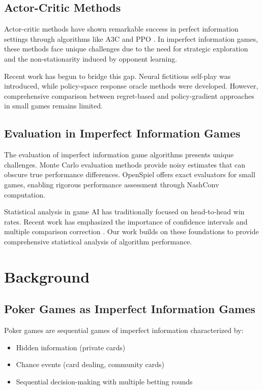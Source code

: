 \documentclass[10pt,twocolumn,conference]{IEEEtran}
\begin{document}
\subsection{Actor-Critic Methods}
Actor-critic methods \cite{konda2000actor} have shown remarkable success in perfect information settings through algorithms like A3C \cite{mnih2016asynchronous} and PPO \cite{schulman2017proximal}. In imperfect information games, these methods face unique challenges due to the need for strategic exploration and the non-stationarity induced by opponent learning.

Recent work has begun to bridge this gap. Neural fictitious self-play \cite{heinrich2015deep} was introduced, while policy-space response oracle methods \cite{waugh2021deep} were developed. However, comprehensive comparison between regret-based and policy-gradient approaches in small games remains limited.

\subsection{Evaluation in Imperfect Information Games}
The evaluation of imperfect information game algorithms presents unique challenges. Monte Carlo evaluation methods provide noisy estimates that can obscure true performance differences. OpenSpiel \cite{lanctot2019openspiel} offers exact evaluators for small games, enabling rigorous performance assessment through NashConv computation.

Statistical analysis in game AI has traditionally focused on head-to-head win rates. Recent work has emphasized the importance of confidence intervals and multiple comparison correction \cite{larus2020statistical}. Our work builds on these foundations to provide comprehensive statistical analysis of algorithm performance.

\section{Background}
\label{sec:background}

\subsection{Poker Games as Imperfect Information Games}
Poker games are sequential games of imperfect information characterized by:
\begin{itemize}
    \item Hidden information (private cards)
    \item Chance events (card dealing, community cards)
    \item Sequential decision-making with multiple betting rounds
\end{itemize}
\end{document}
